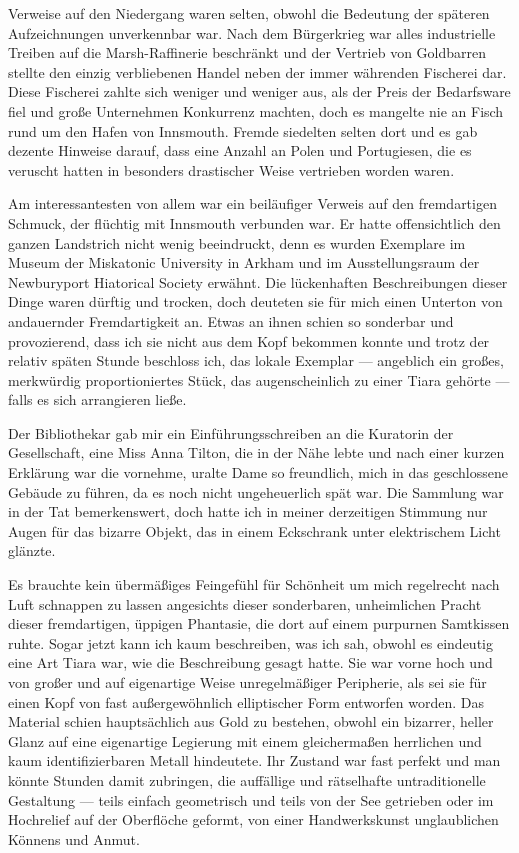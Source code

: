 Verweise auf den Niedergang waren selten, obwohl die Bedeutung der späteren Aufzeichnungen unverkennbar war. Nach dem Bürgerkrieg war alles industrielle Treiben auf die Marsh-Raffinerie beschränkt und der Vertrieb von Goldbarren stellte den einzig verbliebenen Handel neben der immer währenden Fischerei dar. Diese Fischerei zahlte sich weniger und weniger aus, als der Preis der Bedarfsware fiel und große Unternehmen Konkurrenz machten, doch es mangelte nie an Fisch rund um den Hafen von Innsmouth. Fremde siedelten selten dort und es gab dezente Hinweise darauf, dass eine Anzahl an Polen und Portugiesen, die es veruscht hatten in besonders drastischer Weise vertrieben worden waren.

Am interessantesten von allem war ein beiläufiger Verweis auf den fremdartigen Schmuck,  der flüchtig mit Innsmouth verbunden war. Er hatte offensichtlich den ganzen Landstrich nicht wenig beeindruckt,  denn es wurden Exemplare im Museum der Miskatonic University in Arkham und im Ausstellungsraum der Newburyport Hiatorical Society erwähnt. Die lückenhaften Beschreibungen dieser Dinge waren dürftig und trocken,  doch deuteten sie für mich einen Unterton von andauernder Fremdartigkeit an. Etwas an ihnen schien so sonderbar und provozierend, dass ich sie nicht aus dem Kopf bekommen konnte und trotz der relativ späten Stunde beschloss ich, das lokale Exemplar --- angeblich ein großes, merkwürdig proportioniertes Stück, das augenscheinlich zu einer Tiara gehörte --- falls es sich arrangieren ließe.

Der Bibliothekar gab mir ein Einführungsschreiben an die Kuratorin der Gesellschaft, eine Miss Anna Tilton, die in der Nähe lebte und nach einer kurzen Erklärung war die vornehme, uralte Dame so freundlich, mich in das geschlossene Gebäude zu führen, da es noch nicht ungeheuerlich spät war. Die Sammlung war in der Tat bemerkenswert, doch hatte ich in meiner derzeitigen Stimmung nur Augen für das bizarre Objekt, das in einem Eckschrank unter elektrischem Licht glänzte.

Es brauchte kein übermäßiges Feingefühl für Schönheit um mich regelrecht nach Luft schnappen zu lassen angesichts dieser sonderbaren, unheimlichen Pracht dieser fremdartigen, üppigen Phantasie, die dort auf einem purpurnen Samtkissen ruhte. Sogar jetzt kann ich kaum beschreiben, was ich sah, obwohl es eindeutig eine Art Tiara war, wie die Beschreibung gesagt hatte. Sie war vorne hoch und von großer und auf eigenartige Weise unregelmäßiger Peripherie, als sei sie für einen Kopf von fast außergewöhnlich elliptischer Form entworfen worden. Das Material schien hauptsächlich aus Gold zu bestehen, obwohl ein bizarrer, heller Glanz auf eine eigenartige Legierung mit einem gleichermaßen herrlichen und kaum identifizierbaren Metall hindeutete. Ihr Zustand war fast perfekt und man könnte Stunden damit zubringen, die auffällige und rätselhafte untraditionelle Gestaltung --- teils einfach geometrisch und teils von der See getrieben oder im Hochrelief auf der Oberflöche geformt, von einer Handwerkskunst unglaublichen Könnens und Anmut.

